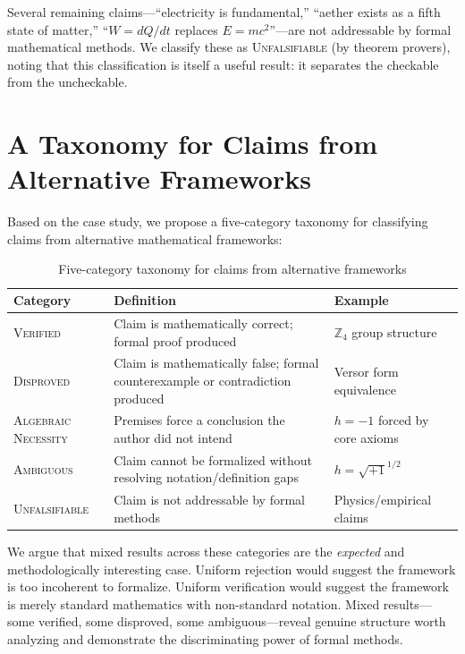 \documentclass[runningheads]{llncs}
\begin{document}
Several remaining claims---``electricity is fundamental,''
``aether exists as a fifth state of matter,'' ``$W = dQ/dt$ replaces
$E = mc^2$''---are not addressable by formal mathematical methods. We classify
these as \textsc{Unfalsifiable} (by theorem provers), noting that this
classification is itself a useful result: it separates the checkable from the
uncheckable.

\section{A Taxonomy for Claims from Alternative Frameworks}
\label{sec:taxonomy}

Based on the case study, we propose a five-category taxonomy for classifying
claims from alternative mathematical frameworks:

\begin{table}[ht]
\centering
\caption{Five-category taxonomy for claims from alternative frameworks}
\label{tab:taxonomy}
\begin{tabular}{@{}lp{4.5cm}p{4cm}@{}}
\toprule
\textbf{Category} & \textbf{Definition} & \textbf{Example} \\
\midrule
\textsc{Verified} & Claim is mathematically correct; formal proof produced &
  $\mathbb{Z}_4$ group structure \\
\textsc{Disproved} & Claim is mathematically false; formal counterexample or
  contradiction produced & Versor form equivalence \\
\textsc{Algebraic Necessity} & Premises force a conclusion the author did not
  intend & $h = -1$ forced by core axioms \\
\textsc{Ambiguous} & Claim cannot be formalized without resolving
  notation/definition gaps & $h = \sqrt{+1}^{1/2}$ \\
\textsc{Unfalsifiable} & Claim is not addressable by formal methods &
  Physics/empirical claims \\
\bottomrule
\end{tabular}
\end{table}

We argue that mixed results across these categories are the \emph{expected} and
methodologically interesting case. Uniform rejection would suggest the framework
is too incoherent to formalize. Uniform verification would suggest the framework
is merely standard mathematics with non-standard notation. Mixed results---some
verified, some disproved, some ambiguous---reveal genuine structure worth
analyzing and demonstrate the discriminating power of formal methods.
\end{document}

